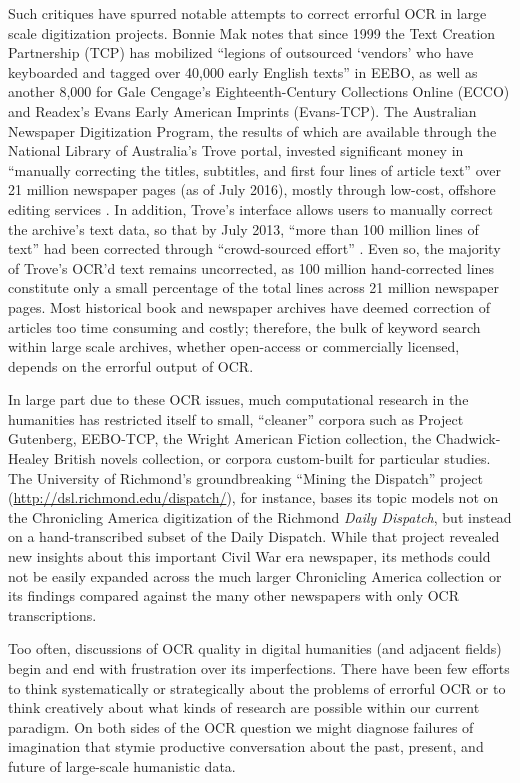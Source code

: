 \documentclass[twoside,11pt]{report}
\begin{document}
Such critiques have spurred notable attempts to correct errorful OCR in large scale digitization projects. Bonnie Mak \citeyearpar{mak14:_archaeol_digit} notes that since 1999 the Text Creation Partnership (TCP) has mobilized ``legions of outsourced `vendors' who have keyboarded and tagged over 40,000 early English texts'' in EEBO, as well as another 8,000 for Gale Cengage's Eighteenth-Century Collections Online (ECCO) and Readex's Evans Early American Imprints (Evans-TCP). The Australian Newspaper Digitization Program, the results of which are available through the National Library of Australia's Trove portal, invested significant money in ``manually correcting the titles, subtitles, and first four lines of article text'' over 21 million newspaper pages (as of July 2016), mostly through low-cost, offshore editing services \citep{bode16:_thous_titles_author}. In addition, Trove's interface allows users to manually correct the archive's text data, so that by July 2013, ``more than 100 million lines of text'' had been corrected through ``crowd-sourced effort'' \citep{ayres13:_singin_supper}.  Even so, the majority of Trove's OCR'd text remains uncorrected, as 100 million hand-corrected lines constitute only a small percentage of the total lines across 21 million newspaper pages. Most historical book and newspaper archives have deemed correction of articles too time consuming and costly; therefore, the bulk of keyword search within large scale archives, whether open-access or commercially licensed, depends on the errorful output of OCR.

In large part due to these OCR issues, much computational research in the humanities has restricted itself to small, ``cleaner'' corpora such as Project Gutenberg, EEBO-TCP, the Wright American Fiction collection, the Chadwick-Healey British novels collection, or corpora custom-built for particular studies. The University of Richmond's groundbreaking ``Mining the Dispatch'' project (\url{http://dsl.richmond.edu/dispatch/}), for instance, bases its topic models not on the Chronicling America digitization of the Richmond \emph{Daily Dispatch}, but instead on a hand-transcribed subset of the Daily Dispatch. While that project revealed new insights about this important Civil War era newspaper, its methods could not be easily expanded across the much larger Chronicling America collection or its findings compared against the many other newspapers with only OCR transcriptions.

Too often, discussions of OCR quality in digital humanities (and adjacent fields) begin and end with frustration over its imperfections. There have been few efforts to think systematically or strategically about the problems of errorful OCR or to think creatively about what kinds of research are possible within our current paradigm. On both sides of the OCR question we might diagnose failures of imagination that stymie productive conversation about the past, present, and future of large-scale humanistic data.
\end{document}
